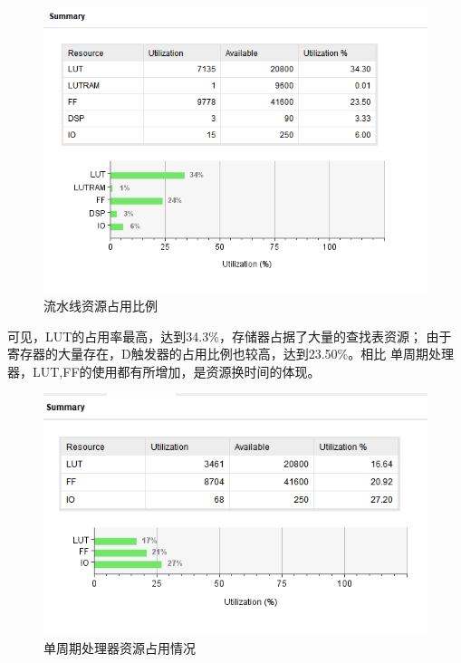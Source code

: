 \documentclass[10pt]{article}
\begin{document}
\begin{figure}[H]
    \centering
    \includegraphics[scale=0.7]{par.png}
    \caption{流水线资源占用比例}
    \end{figure}

可见，LUT的占用率最高，达到34.3\%，存储器占据了大量的查找表资源；
由于寄存器的大量存在，D触发器的占用比例也较高，达到23.50\%。相比
单周期处理器，LUT,FF的使用都有所增加，是资源换时间的体现。

\begin{figure}[H]
    \centering
    \includegraphics[scale=0.7]{sing.png}
    \caption{单周期处理器资源占用情况}
    \end{figure}
\end{document}
